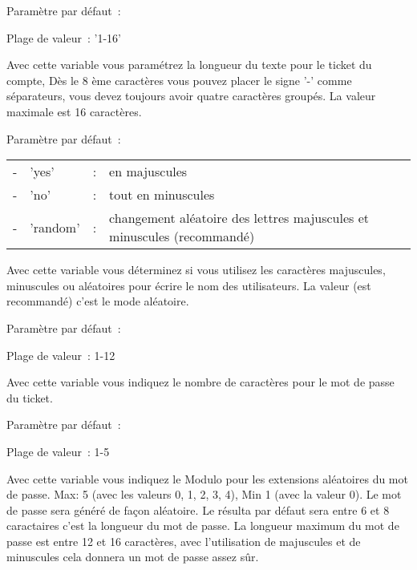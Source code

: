 \begin{description}

   Paramètre par défaut~: 

   Plage de valeur~: '1-16'

   Avec cette variable vous paramétrez la longueur du texte pour le ticket du compte, Dès
   le 8 ème caractères vous pouvez placer le signe '-' comme séparateurs, vous devez toujours
   avoir quatre caractères groupés. La valeur maximale est 16 caractères.


   Paramètre par défaut~: 

   \begin{tabular}{rlrl}
    -&'yes'&:&en majuscules \\
    -&'no'&:&tout en minuscules \\
    -&'random'&:&changement aléatoire des lettres majuscules et minuscules (recommandé) \\
   \end{tabular}

    Avec cette variable vous déterminez si vous utilisez les caractères majuscules, minuscules
	ou aléatoires pour écrire le nom des utilisateurs. La valeur  (est recommandé)
	c'est le mode aléatoire.


   Paramètre par défaut~: 

   Plage de valeur~: 1-12

   Avec cette variable vous indiquez le nombre de caractères pour le mot de passe du ticket.


   Paramètre par défaut~: 

   Plage de valeur~: 1-5

   Avec cette variable vous indiquez le Modulo pour les extensions aléatoires du mot de passe.
   Max: 5 (avec les valeurs 0, 1, 2, 3, 4), Min 1 (avec la valeur 0). Le mot de passe sera généré
   de façon aléatoire. Le résulta par défaut sera entre 6 et 8 caractaires c'est la longueur
   du mot de passe. La longueur maximum du mot de passe est entre 12 et 16 caractères, avec
   l'utilisation de majuscules et de minuscules cela donnera un mot de passe assez sûr.


\end{description}
